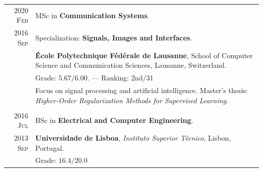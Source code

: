 \documentclass[a4paper,11pt]{article}
\begin{document}
    \begin{tabular}{r|p{13cm}}


      \textsc{2020 Feb}  &
      MSc in \textbf{Communication Systems}. \\
      \textsc{2016 Sep} & Specialization: \textbf{Signals, Images and Interfaces}. \\
      & \footnotesize{\textbf{École Polytechnique Fédérale de Lausanne}, School of Computer Science and Communication Sciences, Lausanne, Switzerland.} \\
      & \footnotesize{
      Grade: $\bm{5.67/6.00}$.} — Ranking: 2nd/31 \\
      & \footnotesize{
        Focus on signal processing and artificial intelligence.
        Master's thesis: \emph{Higher-Order Regularization Methods for Supervised Learning}. 
      } \\
      \multicolumn{2}{c}{} \\

      \textsc{\phantom{5}2016 Jul} &
      BSc in \textbf{Electrical and Computer Engineering}. \\
      \textsc{2013 Sep} &  \footnotesize{\textbf{Universidade de Lisboa}, \emph{Instituto Superior Técnico}, Lisbon, Portugal.} \\
      & \footnotesize{Grade: $\bm{16.4/20.0}$}
    \end{tabular}


\end{document}
